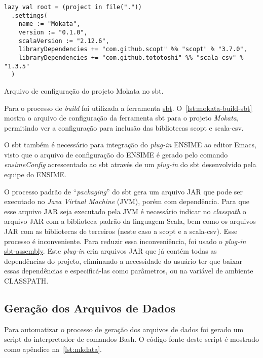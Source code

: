 \documentclass[a4paper,12pt]{scrartcl}
\begin{document}
\begin{listing}[h]
\begin{verbatim}
lazy val root = (project in file("."))
  .settings(
    name := "Mokata",
    version := "0.1.0",
    scalaVersion := "2.12.6",
    libraryDependencies += "com.github.scopt" %% "scopt" % "3.7.0",
    libraryDependencies += "com.github.tototoshi" %% "scala-csv" % "1.3.5"
  )
\end{verbatim}
\caption{Arquivo de configuração do projeto \textsf{Mokata} no sbt.}
\label{lst:mokata-build-sbt}
\end{listing}

Para o processo de \emph{build} foi utilizada a ferramenta
\href{https://www.scala-sbt.org/}{sbt}. O~\autoref{lst:mokata-build-sbt} mostra
o arquivo de configuração da ferramenta sbt para o projeto \emph{Mokata},
permitindo ver a configuração para inclusão das bibliotecas scopt e scala-csv.

O sbt também é necessário para integração do \emph{plug-in} ENSIME ao editor
Emacs, visto que o arquivo de configuração do ENSIME é gerado pelo comando
\emph{ensimeConfig} acrescentado ao sbt através de um \emph{plug-in} do sbt
desenvolvido pela equipe do ENSIME.

O processo padrão de ``\emph{packaging}'' do sbt gera um arquivo JAR que pode
ser executado no \emph{Java Virtual Machine} (JVM), porém com dependência. Para
que esse arquivo JAR seja executado pela JVM é necessário indicar no
\emph{classpath} o arquivo JAR com a biblioteca padrão da linguagem Scala, bem
como os arquivos JAR com as bibliotecas de terceiros (neste caso a scopt e a
scala-csv). Esse processo é inconveniente. Para reduzir essa inconveniência, foi
usado o \emph{plug-in} \href{https://github.com/sbt/sbt-assembly}{sbt-assembly}.
Este \emph{plug-in} cria arquivos JAR que já contém todas as dependências do
projeto, eliminando a necessidade do usuário ter que baixar essas dependências e
especificá-las como parâmetros, ou na variável de ambiente CLASSPATH.


\subsection{Geração dos Arquivos de Dados}

Para automatizar o processo de geração dos arquivos de dados foi gerado um
script do interpretador de comandos Bash. O código fonte deste script é mostrado
como apêndice na~\autoref{lst:mkdata}.
\end{document}
